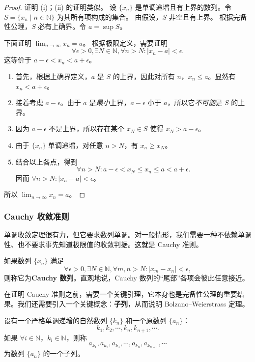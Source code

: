 \begin{proof}
证明 (i)；(ii) 的证明类似。
设 $\{x_n\}$ 是单调递增且有上界的数列。令 $S=\{x_n\mid n\in \mathbb{N}\}$ 为其所有项构成的集合。
由假设，$S$ 非空且有上界。
根据完备性公理，$S$ 必有上确界。令 $a=\sup S$。

下面证明 $\lim_{n\to \infty}x_n=a$。
根据极限定义，需要证明
\[
\forall \epsilon>0,\exists N\in \mathbb{N},\forall n>N:|x_n-a|<\epsilon.
\]
这等价于 $a-\epsilon<x_n<a+\epsilon$。

\begin{enumerate}
    \item 首先，根据上确界定义，$a$ 是 $S$ 的上界，因此对所有 $n$，$x_n\le a$。显然有 $x_n<a+\epsilon$。
    \item 接着考虑 $a-\epsilon$。由于 $a$ 是\textit{最小}上界，$a-\epsilon$ 小于 $a$，所以它\textit{不可能}是 $S$ 的上界。
    \item 因为 $a-\epsilon$ 不是上界，所以存在某个 $x_N\in S$ 使得 $x_N>a-\epsilon$。
    \item 由于 $\{x_n\}$ 单调递增，对任意 $n>N$，有 $x_n\ge x_N$。
    \item 结合以上各点，得到
    \[
    \forall n>N:a-\epsilon<x_N\le x_n\le a<a+\epsilon.
    \]
    因而 $\forall n>N:|x_n-a|<\epsilon$。
\end{enumerate}
所以 $\lim_{n\to \infty}x_n=a$。
\end{proof}

\subsubsection{Cauchy 收敛准则}

单调收敛定理很有力，但它要求数列单调。对一般情形，我们需要一种不依赖单调性、也不要求事先知道极限值的收敛判据。这就是 Cauchy 准则。

\begin{definition}[Cauchy 数列]
如果数列 $\{x_n\}$ 满足
\[
\forall \epsilon>0,\exists N\in \mathbb{N},\forall m,n>N:|x_m-x_n|<\epsilon,
\]
则称它为\textbf{Cauchy 数列}。直观地说，Cauchy 数列的“尾部”各项会彼此任意接近。
\end{definition}

在证明 Cauchy 准则之前，需要一个关键引理，它本身也是完备性公理的重要结果。我们还需要引入一个关键概念：\textbf{子列}，从而说明 Bolzano--Weierstrass 定理。

\begin{definition}[子列]
设有一个严格单调递增的自然数列 $\{k_n\}$ 和一个原数列 $\{a_n\}$：
\[
k_1,k_2,\cdots,k_n,k_{n+1},\cdots.
\]
如果 $\forall i\in \mathbb{N}$，$k_i\in \mathbb{N}$，则称
\[
a_{k_1},a_{k_2},a_{k_3},\cdots,a_{k_n},a_{k_{n+1}},\cdots
\]
为数列 $\{a_n\}$ 的一个子列。
\end{definition}

